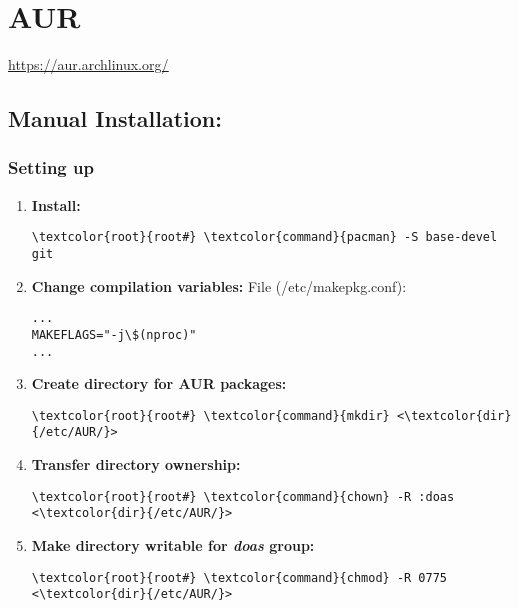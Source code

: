 \documentclass[10pt, a4paper, onecolumn, openany]{book} %
\begin{document}
\section{AUR}
\underline{\href{https://aur.archlinux.org/}{https://aur.archlinux.org/}}
\subsection{Manual Installation:}
\subsubsection{Setting up}
\begin{enumerate}
    \item \textbf{Install:}
\begin{Verbatim}[commandchars=\\\{\}]
\textcolor{root}{root#} \textcolor{command}{pacman} -S base-devel git
\end{Verbatim}
    \item \textbf{Change compilation variables:}
\newline File (\textcolor{file}{/etc/makepkg.conf}):
\begin{Verbatim}[commandchars=\\\{\}]
...
MAKEFLAGS="-j\$(nproc)"
...
\end{Verbatim}
    \item \textbf{Create directory for AUR packages:}
\begin{Verbatim}[commandchars=\\\{\}]
\textcolor{root}{root#} \textcolor{command}{mkdir} <\textcolor{dir}{/etc/AUR/}>
\end{Verbatim}
    \item \textbf{Transfer directory ownership:}
\begin{Verbatim}[commandchars=\\\{\}]
\textcolor{root}{root#} \textcolor{command}{chown} -R :doas <\textcolor{dir}{/etc/AUR/}>
\end{Verbatim}
    \item \textbf{Make directory writable for \textit{doas} group:}
\begin{Verbatim}[commandchars=\\\{\}]
\textcolor{root}{root#} \textcolor{command}{chmod} -R 0775 <\textcolor{dir}{/etc/AUR/}>
\end{Verbatim}
\end{enumerate}
\end{document}
